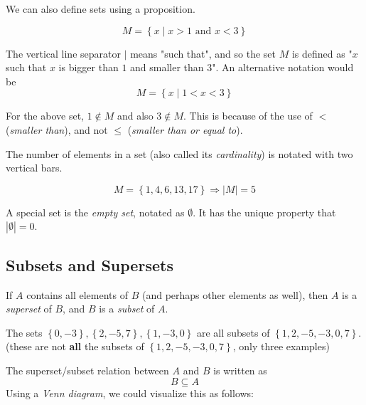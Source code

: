We can also define sets using a proposition.
\begin{example}
  \begin{equation*}
  M = \left\{ x \mid x>1 \text{ and } x<3  \right\}
  \end{equation*}
\end{example}
The vertical line separator $\mid$ means "such that", and so the set $M$ is defined as "$x$ such that $x$ is bigger than $1$ and smaller than $3$". An alternative notation would be
\begin{equation*}
  M = \left\{ x \mid 1<x<3 \right\}
\end{equation*}

\begin{warning}
For the above set, $1\notin M$ and also $3\notin M$. This is because of the use of $<$ (\emph{smaller than}), and not $\leq$ (\emph{smaller than or equal to}).
\end{warning}

The number of elements in a set (also called its \emph{cardinality}) is notated with two vertical bars.
\begin{example}
  \begin{equation*}
  M=\left\{ 1,4,6,13,17 \right\} \Rightarrow \left| M \right|=5
  \end{equation*}
\end{example}

A special set is the \emph{empty set}, notated as $\emptyset$. It has the unique property that $\left| \emptyset \right|=0$.

\subsection{Subsets and Supersets}
If $A$ contains all elements of $B$ (and perhaps other elements as well), then $A$ is a \emph{superset} of $B$, and $B$ is a \emph{subset} of $A$.
\begin{example}
  The sets $\left\{ 0,-3 \right\}, \left\{ 2,-5,7 \right\}, \left\{ 1,-3,0 \right\}$ are all subsets of $\left\{ 1,2,-5,-3,0,7 \right\}$.
  (these are not \textbf{all} the subsets of $\left\{ 1,2,-5,-3,0,7 \right\}$, only three examples)
\end{example}

The superset/subset relation between $A$ and $B$ is written as
\begin{equation*}
  B\subseteq A
\end{equation*}
Using a \emph{Venn diagram}, we could visualize this as follows:
\begin{figure}[H]
  \centering
\end{figure}

